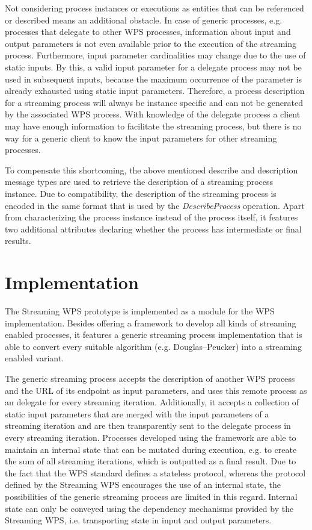   Not considering process instances or executions as entities that can be referenced or described means an additional obstacle. In case of generic processes, e.g. processes that delegate to other \ac{WPS} processes, information about input and output parameters is not even available prior to the execution of the streaming process. Furthermore, input parameter cardinalities may change due to the use of static inputs. By this, a valid input parameter for a delegate process may not be used in subsequent inputs, because the maximum occurrence of the parameter is already exhausted using static input parameters. Therefore, a process description for a streaming process will always be instance specific and can not be generated by the associated \ac{WPS} process. With knowledge of the delegate process a client may have enough information to facilitate the streaming process, but there is no way for a generic client to know the input parameters for other streaming processes.

  To compensate this shortcoming, the above mentioned describe and description message types are used to retrieve the description of a streaming process instance. Due to compatibility, the description of the streaming process is encoded in the same format that is used by the \emph{DescribeProcess} operation. Apart from characterizing the process instance instead of the process itself, it features two additional attributes declaring whether the process has intermediate or final results.

\section{Implementation}
  The Streaming WPS prototype is implemented as a module for the \ftn WPS implementation. Besides offering a framework to develop all kinds of streaming enabled processes, it features a generic streaming process implementation that is able to convert every suitable algorithm (e.g. Douglas–Peucker) into a streaming enabled variant.

  The generic streaming process accepts the description of another WPS process and the URL of its endpoint as input parameters, and uses this remote process as an delegate for every streaming iteration. Additionally, it accepts a collection of static input parameters that are merged with the input parameters of a streaming iteration and are then transparently sent to the delegate process in every streaming iteration. Processes developed using the framework are able to maintain an internal state that can be mutated during execution, e.g. to create the sum of all streaming iterations, which is outputted as a final result. Due to the fact that the WPS standard defines a stateless protocol, whereas the protocol defined by the Streaming WPS encourages the use of an internal state, the possibilities of the generic streaming process are limited in this regard. Internal state can only be conveyed using the dependency mechanisms provided by the Streaming WPS, i.e. transporting state in input and output parameters.

